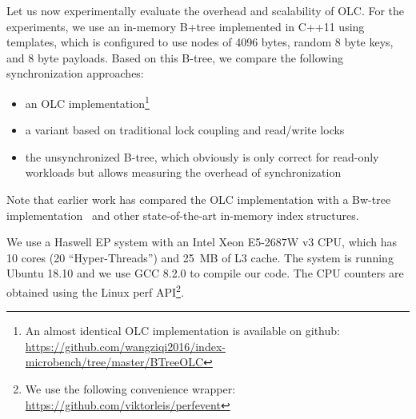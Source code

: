 \documentclass[11pt]{article}
\begin{document}
Let us now experimentally evaluate the overhead and scalability of OLC.
For the experiments, we use an in-memory B+tree implemented in C++11 using templates, which is configured to use nodes of 4096 bytes, random 8 byte keys, and 8 byte payloads.
Based on this B-tree, we compare the following synchronization approaches:
\begin{itemize}
\item an OLC implementation\footnote{An almost identical OLC implementation is available on github: \url{https://github.com/wangziqi2016/index-microbench/tree/master/BTreeOLC}}
\item a variant based on traditional lock coupling and read/write locks
\item the unsynchronized B-tree, which obviously is only correct for read-only workloads but allows measuring the overhead of synchronization
\end{itemize}
Note that earlier work has compared the OLC implementation with a Bw-tree implementation~\cite{buzzword} and other state-of-the-art in-memory index structures.

We use a Haswell EP system with an Intel Xeon E5-2687W v3 CPU, which has 10 cores (20 ``Hyper-Threads'') and 25~MB of L3 cache.
The system is running Ubuntu 18.10 and we use GCC 8.2.0 to compile our code.
The CPU counters are obtained using the Linux perf API\footnote{We use the following convenience wrapper: \url{https://github.com/viktorleis/perfevent}}.
\end{document}
